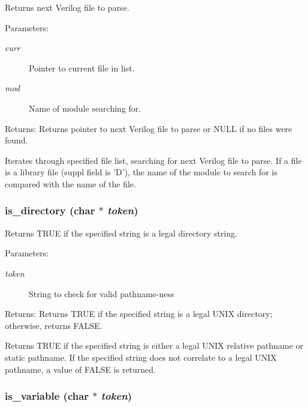 Returns next Verilog file to parse.

\begin{Desc}
\item[Parameters:]
\begin{description}
\item[{\em curr}]Pointer to current file in list. \item[{\em mod}]Name of module searching for.\end{description}
\end{Desc}
\begin{Desc}
\item[Returns:]Returns pointer to next Verilog file to parse or NULL if no files were found.\end{Desc}
Iterates through specified file list, searching for next Verilog file to parse. If a file is a library file (suppl field is 'D'), the name of the module to search for is compared with the name of the file. 
\subsubsection{ is\_\-directory (char $\ast$ {\em token})}\label{util_8c_a9}


Returns TRUE if the specified string is a legal directory string.

\begin{Desc}
\item[Parameters:]
\begin{description}
\item[{\em token}]String to check for valid pathname-ness \end{description}
\end{Desc}
\begin{Desc}
\item[Returns:]Returns TRUE if the specified string is a legal UNIX directory; otherwise, returns FALSE.\end{Desc}
Returns TRUE if the specified string is either a legal UNIX relative pathname or static pathname. If the specified string does not correlate to a legal UNIX pathname, a value of FALSE is returned. 
\subsubsection{ is\_\-variable (char $\ast$ {\em token})}\label{util_8c_a8}


